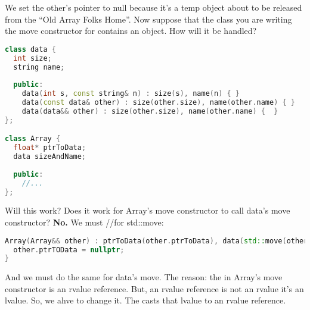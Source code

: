 We set the other's pointer to null because it's a temp object about to be released from the ``Old Array Folks Home''. Now suppose that the class you are writing the move constructor for contains an object. How will it be handled?

\begin{lstlisting}[language=C++]
class data {
  int size;
  string name;
  
  public:
    data(int s, const string& n) : size(s), name(n) { }
    data(const data& other) : size(other.size), name(other.name) { }
    data(data&& other) : size(other.size), name(other.name) {  }
};

class Array {
  float* ptrToData;
  data sizeAndName;
  
  public:
    //...
};
\end{lstlisting}

Will this work? Does it work for Array's move constructor to call data's move constructor? \textbf{No.} We must  //for std::move:

\begin{lstlisting}[language=C++]
Array(Array&& other) : ptrToData(other.ptrToData), data(std::move(other.data)) {
  other.ptrTOData = nullptr;
}
\end{lstlisting}

And we must do the same for data's move. The reason: the  in Array's move constructor is an rvalue reference. But, an rvalue reference is not an rvalue it's an lvalue. So, we ahve to change it. The  casts that lvalue to an rvalue reference.
